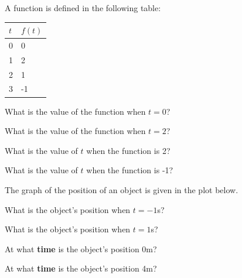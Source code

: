 \begin{problem}
\item A function is defined in the following table:

  \begin{tabular}{l|l}
    $t$ & $f(t)$ \\ \hline
    0 & 0 \\
    1 & 2 \\
    2 & 1 \\
    3 & -1
  \end{tabular}

  \begin{subproblem}
  \item What is the value of the function when $t=0$?
    \vfill
  \item What is the value of the function when $t=2$?
    \vfill
  \item What is the value of $t$ when the function is 2?
    \vfill
  \item What is the value of $t$ when the function is -1?
    \vfill
  \end{subproblem}

\clearpage

\item The graph of the position of an object is given in the plot
  below.

  \scalebox{0.55}{}

  \begin{subproblem}
    \item What is the object's position when $t=-1$s?
      \vfill

    \item What is the object's position when $t=1$s?
      \vfill

    \item At what \textbf{time} is the object's position 0m?
      \vfill

    \item At what \textbf{time} is the object's position 4m?
      \vfill

  \end{subproblem}



\end{problem}



